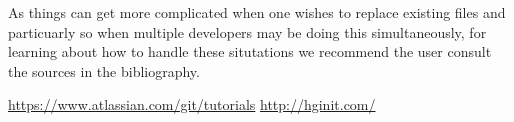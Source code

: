 \documentclass[11pt]{amsart}
\begin{document}
As things can get more complicated when one wishes to replace existing files and particuarly so when multiple developers may be doing this simultaneously, for learning about how to handle these situtations we recommend the user consult the sources in the bibliography. 

\renewcommand\refname{Bibliography}
\begin{thebibliography}{99}
     \url{https://www.atlassian.com/git/tutorials}
     \url{http://hginit.com/}
\end{thebibliography}
\end{document}
